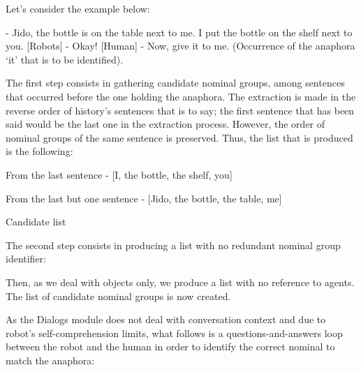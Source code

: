 \documentclass[twoside,a4paper,10pt]{report}
\begin{document}
Let’s consider the example below:


\small
\begin{verbatimtab}
  [Human]  - Jido, the bottle is on the table next to me. I put the bottle on the shelf next to you.
  [Robots] - Okay!
  [Human]  - Now, give it to me. (Occurrence of the anaphora ‘it’ that is to be identified).
\end{verbatimtab}
\normalsize

The first step consists in gathering candidate nominal groups, among sentences that occurred before the one holding the anaphora. The extraction is made in the reverse order of history’s sentences that is to say; the first sentence that has been said would be the last one in the extraction process. However, the order of nominal groups of the same sentence is preserved. Thus, the list that is produced is the following:



\small
\begin{verbatimtab}
   From the last sentence - [I, the bottle, the shelf, you] 
\end{verbatimtab}
\normalsize

\small
\begin{verbatimtab}
   From the last but one sentence - [Jido, the bottle, the table, me]
\end{verbatimtab}
\normalsize

Candidate list


\small
\begin{verbatimtab}
\end{verbatimtab}
\normalsize

The second step consists in producing a list with no redundant nominal group identifier:


\small
\begin{verbatimtab}
\end{verbatimtab}
\normalsize

Then, as we deal with objects only, we produce a list with no reference to agents. The list of candidate nominal groups is now created.


\small
\begin{verbatimtab}
\end{verbatimtab}
\normalsize

As the Dialogs module does not deal with conversation context and due to robot’s self-comprehension limits, what follows is a questions-and-answers loop between the robot and the human in order to identify the correct nominal to match the anaphora: 
\end{document}
